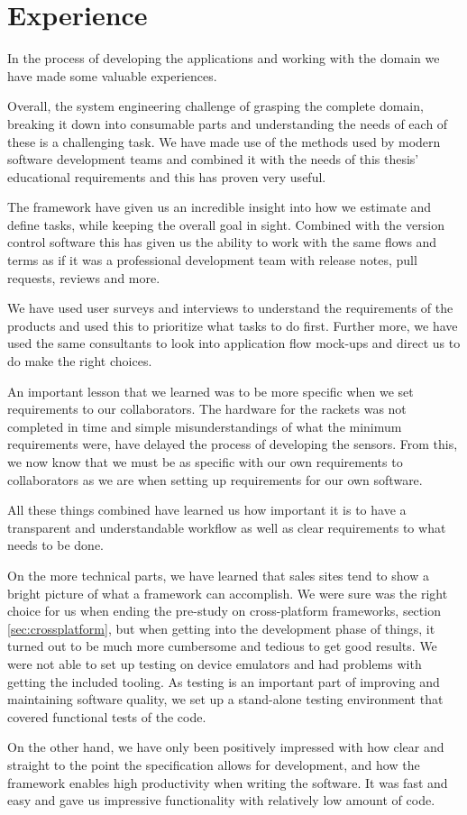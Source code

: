 \chapter{Experience}
In the process of developing the applications and working with the domain we have made some valuable experiences.

Overall, the system engineering challenge of grasping the complete domain, breaking it down into consumable parts and understanding the needs of each of these is a challenging task.
We have made use of the methods used by modern software development teams and combined it with the needs of this thesis' educational requirements and this has proven very useful.

The  framework have given us an incredible insight into how we estimate and define tasks, while keeping the overall goal in sight.
Combined with the version control software this has given us the ability to work with the same flows and terms as if it was a professional development team with release notes, pull requests, reviews and more.

We have used user surveys and interviews to understand the requirements of the products and used this to prioritize what tasks to do first.
Further more, we have used the same consultants to look into application flow mock-ups and direct us to do make the right choices.

An important lesson that we learned was to be more specific when we set requirements to our collaborators.
The hardware for the rackets was not completed in time and simple misunderstandings of what the minimum requirements were, have delayed the process of developing the sensors.
From this, we now know that we must be as specific with our own requirements to collaborators as we are when setting up requirements for our own software.

All these things combined have learned us how important it is to have a transparent and understandable workflow as well as clear requirements to what needs to be done.

On the more technical parts, we have learned that sales sites tend to show a bright picture of what a framework can accomplish.
We were sure  was the right choice for us when ending the pre-study on cross-platform frameworks, section \ref{sec:crossplatform}, but when getting into the development phase of things, it turned out to be much more cumbersome and tedious to get good results.
We were not able to set up testing on device emulators and had problems with getting the included tooling.
As testing is an important part of improving and maintaining software quality, we set up a stand-alone testing environment that covered functional tests of the code.

On the other hand, we have only been positively impressed with how clear and straight to the point the  specification allows for development, and how the  framework enables high productivity when writing the software.
It was fast and easy and gave us impressive functionality with relatively low amount of code.
